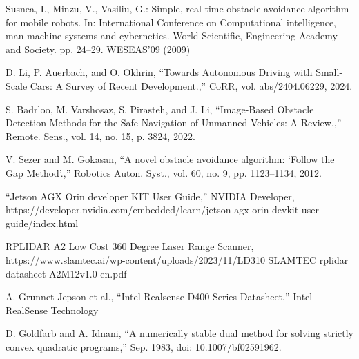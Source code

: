 \documentclass[conference]{IEEEtran}
\begin{document}


\begin{thebibliography}{00}


 Susnea, I., Minzu, V., Vasiliu, G.: Simple, real-time obstacle avoidance algorithm for mobile robots. In: International Conference on Computational
intelligence, man-machine systems and cybernetics. World Scientific, Engineering Academy and Society. pp. 24–29. WESEAS’09 (2009)

 D. Li, P. Auerbach, and O. Okhrin, “Towards Autonomous Driving with Small-Scale Cars: A Survey of Recent Development.,” CoRR, vol. abs/2404.06229, 2024.


 S. Badrloo, M. Varshosaz, S. Pirasteh, and J. Li, “Image-Based Obstacle Detection Methods for the Safe Navigation of Unmanned Vehicles: A Review.,” Remote. Sens., vol. 14, no. 15, p. 3824, 2022.

 V. Sezer and M. Gokasan, “A novel obstacle avoidance algorithm: ‘Follow the Gap Method’.,” Robotics Auton. Syst., vol. 60, no. 9, pp. 1123–1134, 2012.

 “Jetson AGX Orin developer KIT User Guide,” NVIDIA Developer, https://developer.nvidia.com/embedded/learn/jetson-agx-orin-devkit-user-guide/index.html 


 RPLIDAR A2 Low Cost 360 Degree Laser Range Scanner, https://www.slamtec.ai/wp-content/uploads/2023/11/LD310 \textunderscore SLAMTEC \textunderscore rplidar \textunderscore datasheet \textunderscore A2M12\textunderscore v1.0 \textunderscore en.pdf 


 A. Grunnet-Jepson et al., “Intel-Realsense D400 Series Datasheet,” Intel RealSense Technology



 D. Goldfarb and A. Idnani, “A numerically stable dual method for solving strictly convex quadratic programs,” Sep. 1983, doi: 10.1007/bf02591962.



\end{thebibliography}
\end{document}
